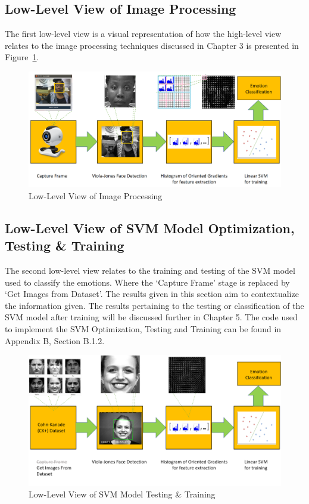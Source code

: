 \subsection{Low-Level View of Image Processing}

The first low-level view is a visual representation of how the high-level view relates to the image processing techniques discussed in Chapter 3 is presented in Figure~\ref{fig: lowlevel}. 
\begin{figure}[H]
  \centering
  \includegraphics[scale=0.2]{pres2}
  \caption{Low-Level View of Image Processing}
  \label{fig: lowlevel}
\end{figure}


\subsection{Low-Level View of SVM Model Optimization, Testing \& Training}

The second low-level view relates to the training and testing of the SVM model used to classify the emotions. Where the `Capture Frame' stage is replaced by `Get Images from Dataset'. The results given in this section aim to contextualize the information given. The results pertaining to the testing or classification of the SVM model after training will be discussed further in Chapter 5. The code used to implement the SVM Optimization, Testing and Training can be found in Appendix B, Section B.1.2.
\begin{figure}[H]
  \centering
  \includegraphics[scale=0.65]{second}
  \caption{Low-Level View of SVM Model Testing \& Training}
  \label{fig: lowlevel2}
\end{figure} 


